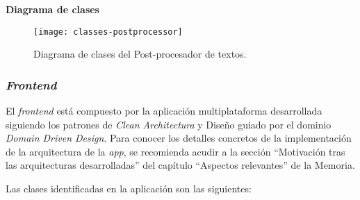 \noindent
\textbf{Diagrama de clases}

\begin{figure}[h]
	\centering
	\texttt{[image: classes-postprocessor]}
	\vspace{-0.5cm}
	\caption{Diagrama de clases del Post-procesador de textos.}
\end{figure}


\subsubsection{\Large \emph{Frontend}}

El \emph{frontend} está compuesto por la aplicación multiplataforma desarrollada siguiendo los patrones de \emph{Clean Architectura} y Diseño guiado por el dominio \emph{Domain Driven Design}. Para conocer los detalles concretos de la implementación de la arquitectura de la \emph{app}, se recomienda acudir a la sección ``Motivación tras las arquitecturas desarrolladas'' del capítulo ``Aspectos relevantes'' de la Memoria.

Las clases identificadas en la aplicación son las siguientes:

